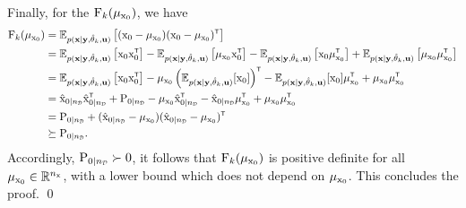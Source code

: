 Finally, for the ${ \mathrm{F} }_k(\mu_{{ \mathrm{x} }_0})$, we have
\begin{align}
   \mxF_k(\mu_{\vcx_0}) 
   &= 
   \mathbb{E}_{p(\mathbf{x}|\mathbf{y},\hat{\vctheta}_k,\mathbf{u})} \left[(\vcx_0-\vcmu_{\vcx_0}) (\vcx_0-\vcmu_{\vcx_0})^\tr\right]
   \\
   &= 
   \mathbb{E}_{p(\mathbf{x}|\mathbf{y},\hat{\vctheta}_k,\mathbf{u})} 
   \left[\vcx_0\vcx_0^\tr\right] 
   -
   \mathbb{E}_{p(\mathbf{x}|\mathbf{y},\hat{\vctheta}_k,\mathbf{u})} 
   \left[\vcmu_{\vcx_0}\vcx_0^\tr\right]
   -
   \mathbb{E}_{p(\mathbf{x}|\mathbf{y},\hat{\vctheta}_k,\mathbf{u})} 
   \left[\vcx_0\vcmu_{\vcx_0}^\tr\right]
   +
   \mathbb{E}_{p(\mathbf{x}|\mathbf{y},\hat{\vctheta}_k,\mathbf{u})} 
   \left[\vcmu_{\vcx_0}\vcmu_{\vcx_0}^\tr\right] 
    \\
   &= 
   \mathbb{E}_{p(\mathbf{x}|\mathbf{y},\hat{\vctheta}_k,\mathbf{u})} 
   \left[\vcx_0\vcx_0^\tr\right] 
   -
   \vcmu_{\vcx_0}\left(\mathbb{E}_{p(\mathbf{x}|\mathbf{y},\hat{\vctheta}_k,\mathbf{u})} 
   [\vcx_0]\right)^\tr
   -
   \mathbb{E}_{p(\mathbf{x}|\mathbf{y},\hat{\vctheta}_k,\mathbf{u})} 
    [\vcx_0]\vcmu_{\vcx_0}^\tr
   +
   \vcmu_{\vcx_0}\vcmu_{\vcx_0}^\tr 
    \\
   &= \hat{\vcx}_{0|\nD}\hat{\vcx}_{0|\nD}^\tr +
    \mxP_{0|\nD} - \vcmu_{\vcx_0}\hat{\vcx}_{0|\nD}^\tr - \hat{\vcx}_{0|\nD}\vcmu_{\vcx_0}^\tr + \vcmu_{\vcx_0}\vcmu_{\vcx_0}^\tr
    \\
   &=
   \mxP_{0|\nD} + (\hat{\vcx}_{0|\nD} - \vcmu_{\vcx_0})(\hat{\vcx}_{0|\nD} - \vcmu_{\vcx_0})^\tr 
   \\
   &\succeq \mxP_{0|\nD}.
\end{align}
Accordingly, $\mxP_{0|\nD} \succ 0$, it follows that ${ \mathrm{F} }_k(\mu_{{ \mathrm{x} }_0})$ is positive definite for all $\mu_{{ \mathrm{x} }_0} \in {\mathbb{R}}^{n_{ \mathrm{x} }}$, with a lower bound which does not depend on ${ \mathrm{\mu} }_{{ \mathrm{x} }_0}$. This concludes the proof.
\qed



